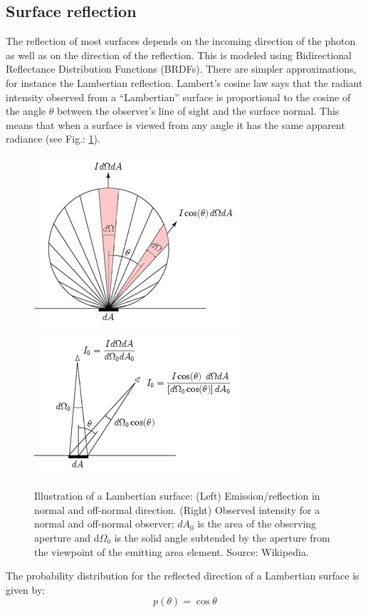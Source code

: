 \documentclass[12pt,twoside,a4paper]{article}
\begin{document}
\subsection{Surface reflection}
\label{sec:surface}
The reflection of most surfaces depends on the incoming direction of
the photon as well as on the direction of the reflection. This is
modeled using Bidirectional Reflectance Distribution Functions
(BRDFs). There are simpler approximations, for instance the 
Lambertian reflection. Lambert's cosine law says that the radiant intensity
observed from a ``Lambertian'' surface is proportional to the cosine
of the angle $\theta$ between the observer's line of sight and the
surface normal. This means that when a surface is viewed from any
angle it has the same apparent radiance (see Fig.: \ref{fig:Lambert}).
\begin{figure}[htbp]
  \includegraphics[width=.5\hsize]{./figs/LambertCosineLaw1.png}
  \includegraphics[width=.5\hsize]{./figs/LambertCosineLaw2.png}
  \caption{ Illustration of a Lambertian surface: (Left) Emission/reflection in normal and off-normal direction. (Right) Observed intensity for a normal and off-normal observer; $dA_0$ is the area of the observing aperture and d$\Omega_0$ is the solid angle subtended by the aperture from the viewpoint of the emitting area element. Source: Wikipedia.}
    \label{fig:Lambert}
\end{figure}

The probability distribution for the reflected direction of a Lambertian
surface is given by: 
\begin{equation}
  \label{eq:lambert}
  p(\theta)=\cos\theta  
\end{equation}
\end{document}
